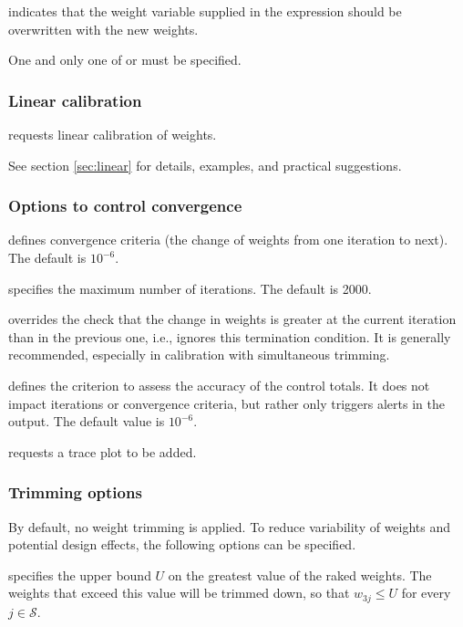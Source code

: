\hangpara
{} indicates that the weight variable supplied in the
\stcmd{[pw=\varname]} expression should be overwritten with the new weights.

One and only one of  or  must be specified.

\subsubsection{Linear calibration}

\hangpara
{}
requests linear calibration of weights.

See section \ref{sec:linear} for details, examples, and practical suggestions.


\subsubsection{Options to control convergence}

\hangpara
{} defines convergence criteria
(the change of weights from one iteration to next). The default is $10^{-6}$.

\hangpara
{} specifies the maximum number
of iterations. The default is 2000.

\hangpara
{} overrides the check
that the change in weights is greater at the current iteration
than in the previous one, i.e., ignores this termination condition.
It is generally recommended, especially in calibration with simultaneous trimming.

\hangpara
{} defines the criterion to
assess the accuracy of the control totals. It does not impact
iterations or convergence criteria, but rather only triggers alerts in the output.
The default value is $10^{-6}$.

\hangpara
{} requests a trace plot to be added.

\subsubsection{Trimming options}
\label{subsubsec:trimming}

By default, no weight trimming is applied. To reduce variability of weights
and potential design effects, the following options can be specified.

\hangpara
{} specifies the upper bound $U$ on the greatest
    value of the raked weights.  The weights that
    exceed this value will be trimmed down, so that
    $w_{3j} \le U$ for every $j\in\mathcal{S}$.

